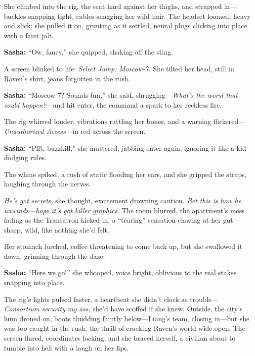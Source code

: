 \documentclass[12pt]{book}
\begin{document}
She climbed into the rig, the seat hard against her thighs, and strapped in—buckles snapping tight, cables snagging her wild hair. The headset loomed, heavy and slick; she pulled it on, grunting as it settled, neural plugs clicking into place with a faint jolt. 

\vspace{0.5em}
\textbf{Sasha:} “Ow, fancy,” she quipped, shaking off the sting.

A screen blinked to life: \emph{Select Jump: Moscow-7.} She tilted her head, still in Raven’s shirt, jeans forgotten in the rush. 

\vspace{0.5em}
\textbf{Sasha:} “Moscow-7? Sounds fun,” she said, shrugging—\emph{What’s the worst that could happen?}—and hit enter, the command a spark to her reckless fire.

The rig whirred louder, vibrations rattling her bones, and a warning flickered—\emph{Unauthorized Access}—in red across the screen. 

\vspace{0.5em}
\textbf{Sasha:} “Pfft, buzzkill,” she muttered, jabbing enter again, ignoring it like a kid dodging rules.

The whine spiked, a rush of static flooding her ears, and she gripped the straps, laughing through the nerves. 

\emph{He’s got secrets,} she thought, excitement drowning caution. \emph{Bet this is how he unwinds—hope it’s got killer graphics.} The room blurred, the apartment’s mess fading as the Transatron kicked in, a “tearing” sensation clawing at her gut—sharp, wild, like nothing she’d felt.

Her stomach lurched, coffee threatening to come back up, but she swallowed it down, grinning through the daze. 

\vspace{0.5em}
\textbf{Sasha:} “Here we go!” she whooped, voice bright, oblivious to the real stakes snapping into place.

The rig’s lights pulsed faster, a heartbeat she didn’t clock as trouble—\emph{Consortium security my ass,} she’d have scoffed if she knew. Outside, the city’s hum droned on, boots thudding faintly below—Liang’s team, closing in—but she was too caught in the rush, the thrill of cracking Raven’s world wide open. The screen flared, coordinates locking, and she braced herself, a civilian about to tumble into hell with a laugh on her lips.

\vspace{1em}
\end{document}
